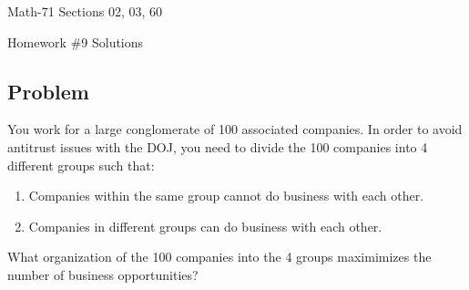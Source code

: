 \documentclass[letterpaper,12pt,fleqn]{article}
\begin{document}
\begin{center}
  \large
  Math-71 Sections 02, 03, 60

  \Large
  Homework \#9 Solutions
\end{center}

\subsection*{Problem}

You work for a large conglomerate of 100 associated companies.  In order to avoid antitrust issues with the DOJ,
you need to divide the 100 companies into 4 different groups such that:
\begin{enumerate}
\item Companies within the same group cannot do business with each other.
\item Companies in different groups can do business with each other.
\end{enumerate}
What organization of the 100 companies into the 4 groups maximimizes the number of business opportunities?
\end{document}
